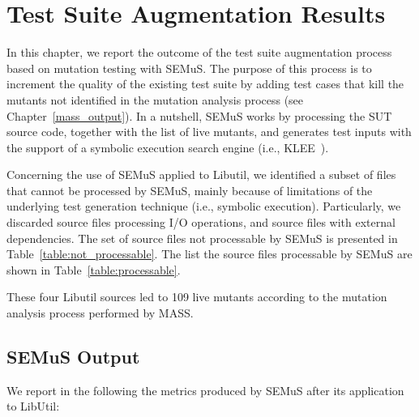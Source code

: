 
\chapter{Test Suite Augmentation Results}

In this chapter, we report the outcome of the test suite augmentation process based on mutation testing with SEMuS. The purpose of this process is to increment the quality of the existing test suite by adding test cases that kill the mutants not identified in the mutation analysis process (see Chapter~\ref{mass_output}). 
In a nutshell, SEMuS works by processing the SUT source code, together with the list of live mutants, and generates test inputs with the support of a symbolic execution search engine (i.e., KLEE~\cite{cadar2008klee}).



Concerning the use of SEMuS applied to Libutil, we identified a subset of files that cannot be processed by SEMuS, mainly because of limitations of the underlying test generation technique (i.e., symbolic execution). Particularly, we discarded source files processing I/O operations, and source files with external dependencies. The set of source files not processable by SEMuS is presented in Table~\ref{table:not_processable}.
The list the source files processable by SEMuS are shown in Table~\ref{table:processable}.





These four Libutil sources led to 109 live mutants according to the mutation analysis process performed by MASS.



\section{SEMuS Output}

We report in the following the metrics produced by SEMuS after its application to LibUtil:


